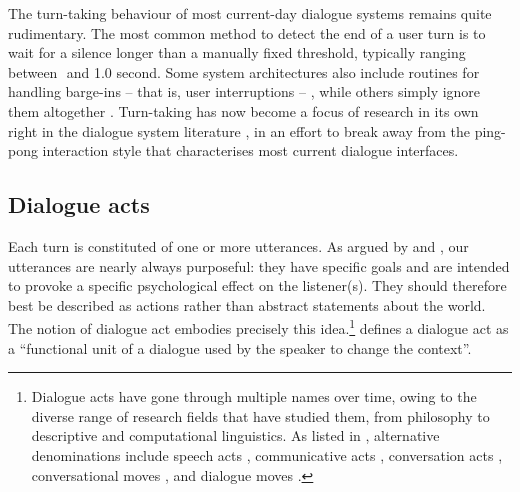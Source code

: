 The turn-taking behaviour of most current-day dialogue systems remains quite rudimentary.  The most common method to detect the end of a user turn is to wait for a silence longer than a manually fixed threshold, typically ranging between 
\textonehalf  $ $ and 1.0 second.  Some system architectures also include routines for handling barge-ins -- that is, user interruptions --  \citep{StromS00}, while others simply ignore them altogether . Turn-taking has now become a focus of research in its own right in the dialogue system literature \citep{RauxE09,Gravano2011}, in an effort to break away from the ping-pong interaction style that characterises most current dialogue interfaces.  

\subsection{Dialogue acts}

Each turn is constituted of one or more utterances.  As argued by \cite{Austin1962} and \cite{Searle1969}, our utterances are nearly always purposeful: they have specific goals and are intended to provoke a specific psychological effect on the listener(s).  They should therefore best be described as actions rather than abstract statements about the world.  The notion of dialogue act embodies precisely this idea.\footnote{Dialogue acts have gone through multiple names over time, owing to the diverse range of research fields that have studied them, from philosophy to descriptive and computational linguistics.  As listed in \cite{mctear2004}, alternative denominations include speech acts \citep{Searle1969}, communicative acts \citep{allwood1976}, conversation acts \citep{TraumH92}, conversational moves \citep{sinclair1975}, and dialogue moves \citep{LarssonCEL99}.} \cite{Bunt1996} defines a dialogue act as a ``functional unit of a dialogue used by the speaker to change the context''.

